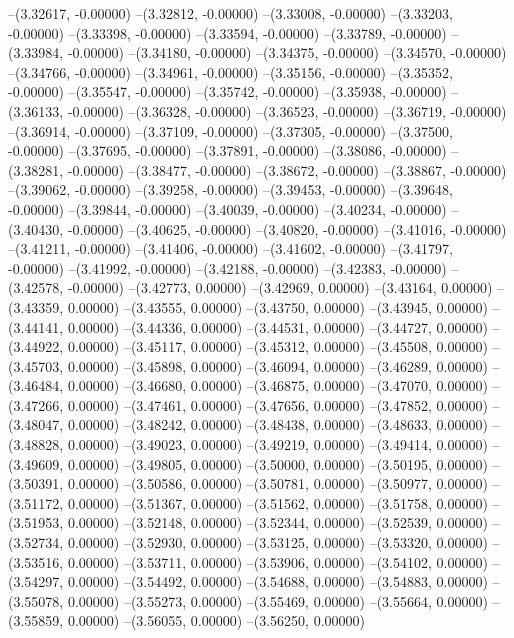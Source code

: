--(3.32617, -0.00000)
--(3.32812, -0.00000)
--(3.33008, -0.00000)
--(3.33203, -0.00000)
--(3.33398, -0.00000)
--(3.33594, -0.00000)
--(3.33789, -0.00000)
--(3.33984, -0.00000)
--(3.34180, -0.00000)
--(3.34375, -0.00000)
--(3.34570, -0.00000)
--(3.34766, -0.00000)
--(3.34961, -0.00000)
--(3.35156, -0.00000)
--(3.35352, -0.00000)
--(3.35547, -0.00000)
--(3.35742, -0.00000)
--(3.35938, -0.00000)
--(3.36133, -0.00000)
--(3.36328, -0.00000)
--(3.36523, -0.00000)
--(3.36719, -0.00000)
--(3.36914, -0.00000)
--(3.37109, -0.00000)
--(3.37305, -0.00000)
--(3.37500, -0.00000)
--(3.37695, -0.00000)
--(3.37891, -0.00000)
--(3.38086, -0.00000)
--(3.38281, -0.00000)
--(3.38477, -0.00000)
--(3.38672, -0.00000)
--(3.38867, -0.00000)
--(3.39062, -0.00000)
--(3.39258, -0.00000)
--(3.39453, -0.00000)
--(3.39648, -0.00000)
--(3.39844, -0.00000)
--(3.40039, -0.00000)
--(3.40234, -0.00000)
--(3.40430, -0.00000)
--(3.40625, -0.00000)
--(3.40820, -0.00000)
--(3.41016, -0.00000)
--(3.41211, -0.00000)
--(3.41406, -0.00000)
--(3.41602, -0.00000)
--(3.41797, -0.00000)
--(3.41992, -0.00000)
--(3.42188, -0.00000)
--(3.42383, -0.00000)
--(3.42578, -0.00000)
--(3.42773, 0.00000)
--(3.42969, 0.00000)
--(3.43164, 0.00000)
--(3.43359, 0.00000)
--(3.43555, 0.00000)
--(3.43750, 0.00000)
--(3.43945, 0.00000)
--(3.44141, 0.00000)
--(3.44336, 0.00000)
--(3.44531, 0.00000)
--(3.44727, 0.00000)
--(3.44922, 0.00000)
--(3.45117, 0.00000)
--(3.45312, 0.00000)
--(3.45508, 0.00000)
--(3.45703, 0.00000)
--(3.45898, 0.00000)
--(3.46094, 0.00000)
--(3.46289, 0.00000)
--(3.46484, 0.00000)
--(3.46680, 0.00000)
--(3.46875, 0.00000)
--(3.47070, 0.00000)
--(3.47266, 0.00000)
--(3.47461, 0.00000)
--(3.47656, 0.00000)
--(3.47852, 0.00000)
--(3.48047, 0.00000)
--(3.48242, 0.00000)
--(3.48438, 0.00000)
--(3.48633, 0.00000)
--(3.48828, 0.00000)
--(3.49023, 0.00000)
--(3.49219, 0.00000)
--(3.49414, 0.00000)
--(3.49609, 0.00000)
--(3.49805, 0.00000)
--(3.50000, 0.00000)
--(3.50195, 0.00000)
--(3.50391, 0.00000)
--(3.50586, 0.00000)
--(3.50781, 0.00000)
--(3.50977, 0.00000)
--(3.51172, 0.00000)
--(3.51367, 0.00000)
--(3.51562, 0.00000)
--(3.51758, 0.00000)
--(3.51953, 0.00000)
--(3.52148, 0.00000)
--(3.52344, 0.00000)
--(3.52539, 0.00000)
--(3.52734, 0.00000)
--(3.52930, 0.00000)
--(3.53125, 0.00000)
--(3.53320, 0.00000)
--(3.53516, 0.00000)
--(3.53711, 0.00000)
--(3.53906, 0.00000)
--(3.54102, 0.00000)
--(3.54297, 0.00000)
--(3.54492, 0.00000)
--(3.54688, 0.00000)
--(3.54883, 0.00000)
--(3.55078, 0.00000)
--(3.55273, 0.00000)
--(3.55469, 0.00000)
--(3.55664, 0.00000)
--(3.55859, 0.00000)
--(3.56055, 0.00000)
--(3.56250, 0.00000)
